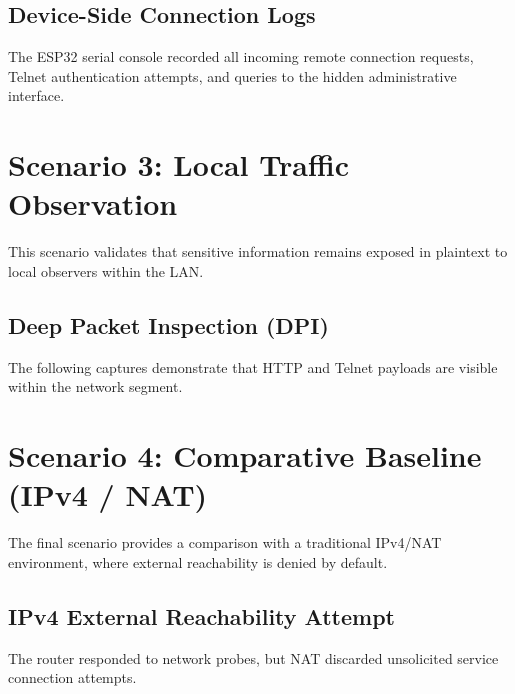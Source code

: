 \subsection{Device-Side Connection Logs}
The ESP32 serial console recorded all incoming remote connection requests, Telnet authentication attempts, and queries to the hidden administrative interface.


\section{Scenario 3: Local Traffic Observation}\label{app:results-s3}
This scenario validates that sensitive information remains exposed in plaintext to local observers within the LAN.

\subsection{Deep Packet Inspection (DPI)}
The following captures demonstrate that HTTP and Telnet payloads are visible within the network segment.


\section{Scenario 4: Comparative Baseline (IPv4 / NAT)}\label{app:results-s4}
The final scenario provides a comparison with a traditional IPv4/NAT environment, where external reachability is denied by default.

\subsection{IPv4 External Reachability Attempt}
The router responded to network probes, but NAT discarded unsolicited service connection attempts.


